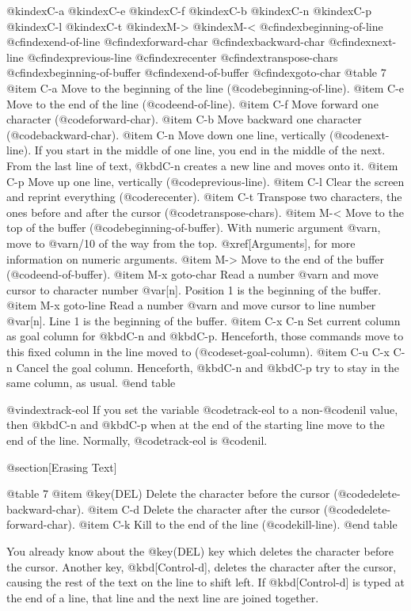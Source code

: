 {{{{@kindex{C-a}
@kindex{C-e}
@kindex{C-f}
@kindex{C-b}
@kindex{C-n}
@kindex{C-p}
@kindex{C-l}
@kindex{C-t}
@kindex{M->}
@kindex{M-<}
@cfindex{beginning-of-line}
@cfindex{end-of-line}
@cfindex{forward-char}
@cfindex{backward-char}
@cfindex{next-line}
@cfindex{previous-line}
@cfindex{recenter}
@cfindex{transpose-chars}
@cfindex{beginning-of-buffer}
@cfindex{end-of-buffer}
@cfindex{goto-char}
@table 7
@item C-a
Move to the beginning of the line (@code{beginning-of-line}).
@item C-e
Move to the end of the line (@code{end-of-line}).
@item C-f
Move forward one character (@code{forward-char}).
@item C-b
Move backward one character (@code{backward-char}).
@item C-n
Move down one line, vertically (@code{next-line}).  If you start in the
middle of one line, you end in the middle of the next.
From the last line of text, @kbd{C-n} creates a new line and moves
onto it.
@item C-p
Move up one line, vertically (@code{previous-line}).
@item C-l
Clear the screen and reprint everything (@code{recenter}).
@item C-t
Transpose two characters, the ones before and after the cursor
(@code{transpose-chars}).
@item M-<
Move to the top of the buffer (@code{beginning-of-buffer}).
With numeric argument @var{n}, move to
@var{n}/10 of the way from the top.  @xref[Arguments], for more information
on numeric arguments.
@item M->
Move to the end of the buffer (@code{end-of-buffer}).
@item M-x goto-char
Read a number @var{n} and move cursor to character number @var[n].
Position 1 is the beginning of the buffer.
@item M-x goto-line
Read a number @var{n} and move cursor to line number @var[n].
Line 1 is the beginning of the buffer.
@item C-x C-n
Set current column as goal column for @kbd{C-n} and @kbd{C-p}.
Henceforth, those commands move to this fixed column in the line moved to
(@code{set-goal-column}).
@item C-u C-x C-n
Cancel the goal column.  Henceforth, @kbd{C-n} and @kbd{C-p}
try to stay in the same column, as usual.
@end table

@vindex{track-eol}
  If you set the variable @code{track-eol} to a non-@code{nil} value, then
@kbd{C-n} and @kbd{C-p} when at the end of the starting line move to the
end of the line.  Normally, @code{track-eol} is @code{nil}.

@section[Erasing Text]

@table 7
@item @key(DEL)
Delete the character before the cursor (@code{delete-backward-char}).
@item C-d
Delete the character after the cursor (@code{delete-forward-char}).
@item C-k
Kill to the end of the line (@code{kill-line}).
@end table

  You already know about the @key(DEL) key which deletes the
character before the cursor.  Another key, @kbd[Control-d], deletes the
character after the cursor, causing the rest of the text on the line to
shift left.  If @kbd[Control-d] is typed at the end of a line, that line
and the next line are joined together.

}}}}
